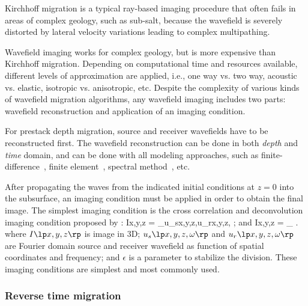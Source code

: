 Kirchhoff migration is a typical ray-based imaging procedure that often fails in areas of complex geology, such as sub-salt, because the wavefield is severely distorted by lateral velocity variations leading to complex multipathing.

Wavefield imaging works for complex geology, but is more expensive than Kirchhoff migration. Depending on computational time and resources available, different levels of approximation are applied, i.e., one way vs. two way, acoustic vs. elastic, isotropic vs. anisotropic, etc. Despite the complexity of various kinds of wavefield migration algorithms, any wavefield imaging includes two parts: wavefield reconstruction and application of an imaging condition. 

For prestack depth migration, source and receiver wavefields have to be reconstructed first.
The wavefield reconstruction can be done in both \emph{depth} and \emph{time} domain, and can be done with all modeling approaches, such as finite-difference~\cite[]{SWP00-00-03100318}, finite element~\cite[]{GEO41-01-01450151}, spectral method~\cite[]{SEG-1991-1561,SEG-1992-1285,SEG-1996-0427}, etc.

After propagating the waves from the indicated initial conditions at $z=0$ into the subsurface, an imaging condition must be applied in order to obtain the final image. The simplest imaging condition is the cross correlation and deconvolution imaging condition proposed by \cite{GEO36-03-04670481}:
\beq
\label{eqn:CIC1}
I\lp x,y,z \rp = \sum_\omega u_s\lp x,y,z,\omega \rp u_r\lp x,y,z,\omega \rp  \; ;
\eeq
and
\beq
\label{eqn:CIC2}        
I\lp x,y,z \rp = \sum_\omega {} \; .
\eeq
where $I\lp x,y,z \rp$ is image in 3D; $u_s\lp x,y,z,\omega \rp$ and $u_r\lp x,y,z,\omega \rp$ are Fourier domain source and receiver wavefield as function of spatial coordinates and frequency; and $\epsilon$ is a parameter to stabilize the division. These imaging conditions are simplest and most commonly used.


\subsubsection{Reverse time migration}


